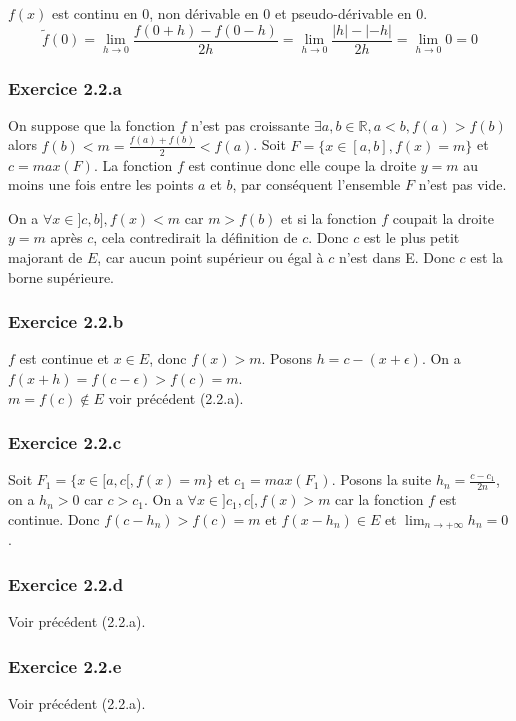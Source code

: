 \documentclass[]{book}
\theoremstyle{definition}
\newcommand{\bb}[1]{\mathbb{#1}}
\newcommand{\R}{\bb{R}}
\begin{document}
$f(x)$ est continu en 0, non d\'erivable en 0 et pseudo-d\'erivable en 0.
$$\tilde{f}(0)= \lim_{h \to 0} \frac{f(0+h)-f(0-h)}{2h} = \lim_{h \to 0} \frac{|h|-|-h|}{2h} = \lim_{h \to 0} 0 = 0$$


\subsubsection*{Exercice 2.2.a}

On suppose que la fonction $f$ n'est pas croissante $\exists a,b \in \R, a<b, f(a) > f(b)$ alors $f(b) < m = \frac{f(a)+f(b)}{2} < f(a)$. Soit $F=\{x \in [a,b], f(x) = m\}$ et $c = max(F)$. La fonction $f$ est continue donc elle coupe la droite $y=m$ au moins une fois entre les points $a$ et $b$, par cons\'equent l'ensemble $F$ n'est pas vide.   

On a $\forall x \in ]c,b], f(x) < m$ car $m > f(b)$ et si la fonction $f$ coupait la droite $y=m$ apr\`es $c$, cela contredirait la d\'efinition de $c$. Donc $c$ est le plus petit majorant de $E$, car aucun point sup\'erieur ou \'egal \`a $c$ n'est dans E. Donc $c$ est la borne sup\'erieure.

\subsubsection*{Exercice 2.2.b}
$f$ est continue et $x \in E$, donc $f(x) > m$. Posons $h = c-(x+\epsilon)$. On a $f(x+h) = f(c-\epsilon) > f(c) = m$. \\

$m = f(c) \notin E$ voir pr\'ec\'edent (2.2.a).

\subsubsection*{Exercice 2.2.c}
Soit $F_1=\{x \in [a,c[, f(x) = m\}$ et $c_1 = max(F_1)$.
Posons la suite $h_n = \frac{c-c_1}{2n}$, on a $h_n > 0$ car $c>c_1$. On a $\forall x \in ]c_1,c[, f(x) > m$ car la fonction $f$ est continue. Donc $f(c-h_n) > f(c) = m$ et $f(x-h_n) \in E$ et $\lim_{n \to +\infty} h_n = 0$.

\subsubsection*{Exercice 2.2.d}
Voir pr\'ec\'edent (2.2.a).

\subsubsection*{Exercice 2.2.e}
Voir pr\'ec\'edent (2.2.a).
\end{document}

